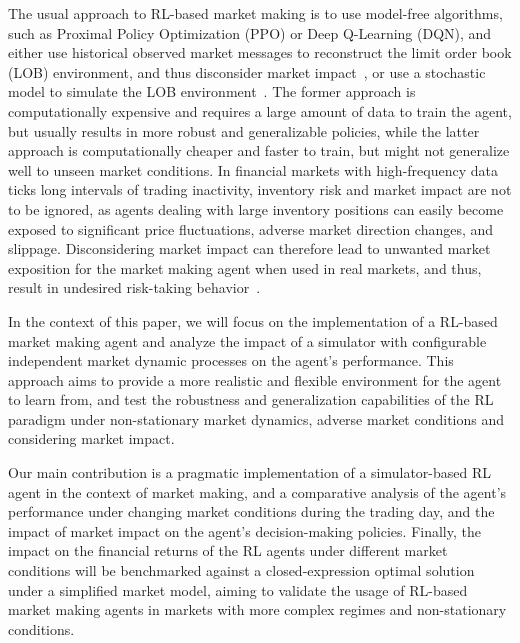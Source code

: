 The usual approach to RL-based market making is to use model-free algorithms, such as Proximal Policy Optimization (PPO) or Deep Q-Learning (DQN),
and either use historical observed market messages to reconstruct the limit order book (LOB) environment,
and thus disconsider market impact~\cite{Frey2023, Ganesh2019}, or use a stochastic model to simulate the LOB environment~\cite{Gasperov2021, Sun2022}.
The former approach is computationally expensive and requires a large amount of data to train the agent,
but usually results in more robust and generalizable policies, while the latter approach is computationally cheaper and faster to train,
but might not generalize well to unseen market conditions.
In financial markets with high-frequency data ticks long intervals of trading inactivity, inventory risk and market impact are not to be ignored,
as agents dealing with large inventory positions can easily become exposed to significant price fluctuations, adverse market direction changes, and slippage.
Disconsidering market impact can therefore lead to unwanted market exposition for the market making agent when used in real markets,
and thus, result in undesired risk-taking behavior~\cite{Jerome2022, Selser2021}.

In the context of this paper, we will focus on the implementation of a RL-based market making agent and
analyze the impact of a simulator with configurable independent market dynamic processes on the agent's performance.
This approach aims to provide a more realistic and flexible environment for the agent to learn from,
and test the robustness and generalization capabilities of the RL paradigm under non-stationary
market dynamics, adverse market conditions and considering market impact.

Our main contribution is a pragmatic implementation of a simulator-based RL agent in the context of market making,
and a comparative analysis of the agent's performance under changing market conditions during the
trading day, and the impact of market impact on the agent's decision-making policies.
Finally, the impact on the financial returns of the RL agents under different market conditions will be benchmarked against a
closed-expression optimal solution under a simplified market model,
aiming to validate the usage of RL-based market making agents in markets with more complex regimes and non-stationary conditions.


